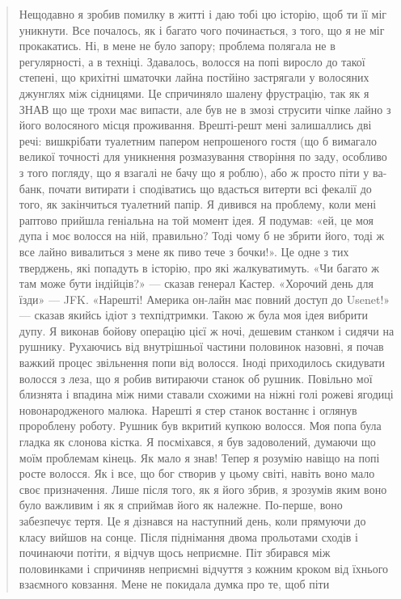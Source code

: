 \begin{quote}
Нещодавно я зробив помилку в житті і даю тобі цю історію, щоб ти її міг
уникнути. Все почалось, як і багато чого починається, з того, що я не міг
прокакатись. Ні, в мене не було запору; проблема полягала не в регулярності,
а в техніці. Здавалось, волосся на попі виросло до такої степені, що крихітні
шматочки лайна постйіно застрягали у волосяних джунглях між сідницями. Це
спричиняло шалену фрустрацію, так як я ЗНАВ що ще трохи має випасти, але був
не в змозі струсити чіпке лайно з його волосяного місця проживання. Врешті-решт
мені залишаллись дві речі: вишкрібати туалетним папером непрошеного гостя
(що б вимагало великої точності для уникнення розмазування створіння по заду,
особливо з того погляду, що я взагалі не бачу що я роблю), або ж просто піти
у ва-банк, почати витирати і сподіватись що вдасться витерти всі фекалії до
того, як закінчиться туалетний папір. Я дивився на проблему, коли мені раптово
прийшла геніальна на той момент ідея. Я подумав: «ей, це моя дупа і моє волосся
на ній, правильно? Тоді чому б не збрити його, тоді ж все лайно вивалиться з
мене як пиво тече з бочки!». Це одне з тих тверджень, які попадуть в історію,
про які жалкуватимуть. «Чи багато ж там може бути індійців?» — сказав генерал
Кастер. «Хорочий день для їзди» — JFK. «Нарешті! Америка он-лайн має повний
доступ до Usenet!» — сказав якийсь ідіот з техпідтримки. Такою ж була моя ідея
вибрити дупу. Я виконав бойову операцію цієї ж ночі, дешевим станком і сидячи
на рушнику. Рухаючись від внутрішньої частини половинок назовні, я почав важкий
процес звільнення попи від волосся. Іноді приходилось скидувати волосся з леза,
що я робив витираючи станок об рушник. Повільно мої близнята і впадина між ними
ставали схожими на ніжні голі рожеві ягодиці новонародженого малюка. Нарешті
я стер станок востаннє і оглянув пророблену роботу. Рушник був вкритий купкою
волосся. Моя попа була гладка як слонова кістка. Я посміхався, я був
задоволений, думаючи що моїм проблемам кінець. Як мало я знав! Тепер я розумію
навіщо на попі росте волосся. Як і все, що бог створив у цьому світі, навіть
воно мало своє призначення. Лише після того, як я його збрив, я зрозумів яким
воно було важливим і як я сприймав його як належне. По-перше, воно забезпечує
тертя. Це я дізнався на наступний день, коли прямуючи до класу вийшов на сонце.
Після піднімання двома прольотами сходів і починаючи потіти, я відчув щось
неприємне. Піт збирався між половинками і спричиняв неприємні відчуття з кожним
кроком від їхнього взаємного ковзання. Мене не покидала думка про те, щоб піти

\end{quote}

